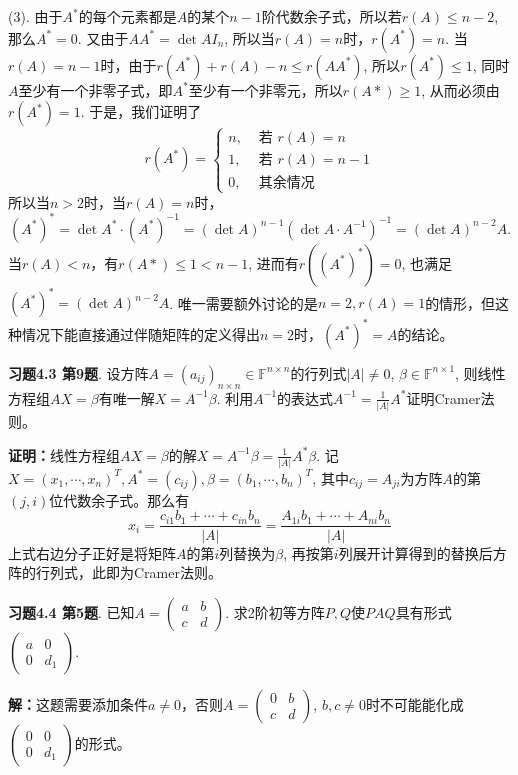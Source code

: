 (3). 由于$A^*$的每个元素都是$A$的某个$n-1$阶代数余子式，所以若$r(A)\leqslant n-2$, 那么$A^* = 0$. 又由于$AA^* = \det A I_n$, 所以当$r(A) = n$时，$r(A^*) = n$. 当$r(A) = n-1$时，由于$r(A^*) + r(A) - n \leqslant r(AA^*)$, 所以$r(A^*) \leqslant 1$, 同时$A$至少有一个非零子式，即$A^*$至少有一个非零元，所以$r(A*) \geqslant 1$, 从而必须由$r(A^*) = 1$. 于是，我们证明了
$$r(A^*) = \begin{cases} n, & \text{ 若 } r(A) = n \\ 1, & \text{ 若 } r(A) = n-1 \\ 0, & \text{ 其余情况} \end{cases}$$
所以当$n > 2$时，当$r(A) = n$时，
$$(A^*)^* = \det A^* \cdot (A^*)^{-1} = (\det A)^{n-1} (\det A \cdot A^{-1})^{-1} = (\det A)^{n-2} A.$$
当$r(A) < n$，有$r(A*) \leqslant 1 < n-1$, 进而有$r((A^*)^*) = 0$, 也满足$(A^*)^* = (\det A)^{n-2}A$. 唯一需要额外讨论的是$n=2, r(A) = 1$的情形，但这种情况下能直接通过伴随矩阵的定义得出$n = 2$时，$(A^*)^* = A$的结论。

\newpageorvspace

{\bf 习题4.3 第9题}. 设方阵$A = (a_{ij})_{n\times n} \in \mathbb{F}^{n\times n}$的行列式$|A| \neq 0$, $\beta\in\mathbb{F}^{n\times 1}$, 则线性方程组$AX=\beta$有唯一解$X = A^{-1}\beta$. 利用$A^{-1}$的表达式$A^{-1} = \frac{1}{|A|}A^*$证明Cramer法则。

{\bf 证明：}线性方程组$AX=\beta$的解$X = A^{-1}\beta = \frac{1}{|A|}A^*\beta$. 记$X = (x_1, \cdots, x_n)^T, A^* = (c_{ij}), \beta = (b_1, \cdots, b_n)^T$, 其中$c_{ij} = A_{ji}$为方阵$A$的第$(j,i)$位代数余子式。那么有
$$x_i = \frac{c_{i1}b_1 + \cdots + c_{in}b_n}{|A|} = \frac{A_{1i}b_1 + \cdots + A_{ni}b_n}{|A|}$$
上式右边分子正好是将矩阵$A$的第$i$列替换为$\beta$, 再按第$i$列展开计算得到的替换后方阵的行列式，此即为Cramer法则。

\newpageorvspace

{\bf 习题4.4 第5题}. 已知$A = \begin{pmatrix} a & b \\ c & d \end{pmatrix}$. 求2阶初等方阵$P,Q$使$PAQ$具有形式$\begin{pmatrix} a & 0 \\ 0 & d_1 \end{pmatrix}$.

{\bf 解：}这题需要添加条件$a\neq 0$，否则$A = \begin{pmatrix} 0 & b \\ c & d \end{pmatrix}$, $b,c\neq 0$时不可能能化成$\begin{pmatrix} 0 & 0 \\ 0 & d_1 \end{pmatrix}$的形式。

